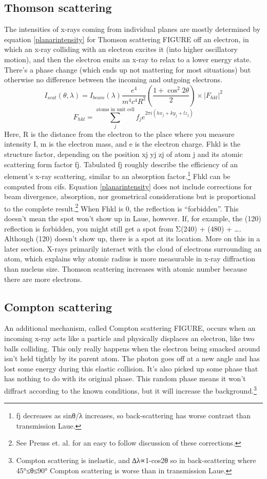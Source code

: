 \subsection{Thomson scattering}
The intensities of x-rays coming from individual planes are mostly determined by equation \ref{planarintensity} for Thomson scattering FIGURE off an electron, in which an x-ray colliding with an electron excites it (into higher oscillatory motion), and then the electron emits an x-ray to relax to a lower energy state. There’s a phase change (which ends up not mattering for most situations) but otherwise no difference between the incoming and outgoing electrons. 
\begin{equation}
    I_{scat}(\theta,\lambda)=I_{beam}(\lambda)\frac{e^4}{m^4c^4R^2}(\frac{1+\cos^2{2\theta}}{2})\times|F_{hkl}|^2
    \label{planarintensity}
\end{equation}
\begin{equation}
    F_{hkl}= \sum_{j}^{\text{atoms in unit cell}} f_je^{2\pi i(hx_j+ky_j+lz_j)}
    \label{Fhkl}
\end{equation}
Here, R is the distance from the electron to the place where you measure intensity I, m is the electron mass, and e is the electron charge. Fhkl is the structure factor, depending on the position xj yj zj of atom j and its atomic scattering form factor fj. Tabulated fj roughly describe the efficiency of an element’s x-ray scattering, similar to an absorption factor.\footnote{fj decreases as sinθ/λ increases, so back-scattering has worse contrast than transmission Laue.} Fhkl can be computed from cifs. Equation \ref{planarintensity} does not include corrections for beam divergence, absorption, nor geometrical considerations but is proportional to the complete result.\footnote{See Preuss et. al. for an easy to follow discussion of these corrections.}
When Fhkl is 0, the reflection is “forbidden”. This doesn’t mean the spot won’t show up in Laue, however. If, for example, the (120) reflection is forbidden, you might still get a spot from  Σ(240) + (480) + …. Although (120) doesn’t show up, there is a spot at its location. More on this in a later section.
X-rays primarily interact with the cloud of electrons surrounding an atom, which explains why atomic radius is more measurable in x-ray diffraction than nucleus size. Thomson scattering increases with atomic number because there are more electrons.
\subsection{Compton scattering}
An additional mechanism, called Compton scattering FIGURE, occurs when an incoming x-ray acts like a particle and physically displaces an electron, like two balls colliding. This only really happens when the electron being smacked around isn’t held tightly by its parent atom. The photon goes off at a new angle and has lost some energy during this elastic collision. It’s also picked up some phase that has nothing to do with its original phase. This random phase means it won’t diffract according to the known conditions, but it will increase the background.\footnote{Compton scattering is inelastic, and ∆λ∝1-cos⁡2θ so in back-scattering where 45°≤θ≤90° Compton scattering is worse than in transmission Laue.}


